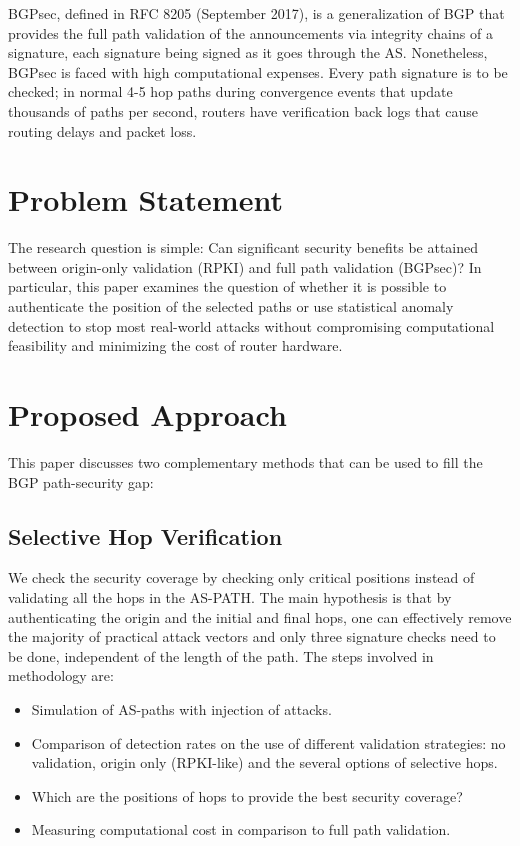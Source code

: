 \documentclass[conference]{IEEEtran}
\begin{document}
BGPsec, defined in RFC 8205 (September 2017), is a generalization of BGP that provides the full path validation of the announcements via integrity chains of a signature, each signature being signed as it goes through the AS. Nonetheless, BGPsec is faced with high computational expenses. Every path signature is to be checked; in normal 4-5 hop paths during convergence events that update thousands of paths per second, routers have verification back logs that cause routing delays and packet loss.

\section{Problem Statement}

The research question is simple: Can significant security benefits be attained between origin-only validation (RPKI) and full path validation (BGPsec)? In particular, this paper examines the question of whether it is possible to authenticate the position of the selected paths or use statistical anomaly detection to stop most real-world attacks without compromising computational feasibility and minimizing the cost of router hardware.

\section{Proposed Approach}

This paper discusses two complementary methods that can be used to fill the BGP path-security gap:

\subsection{Selective Hop Verification}

We check the security coverage by checking only critical positions instead of validating all the hops in the AS-PATH. The main hypothesis is that by authenticating the origin and the initial and final hops, one can effectively remove the majority of practical attack vectors and only three signature checks need to be done, independent of the length of the path. The steps involved in methodology are:

\begin{itemize}
\item Simulation of AS-paths with injection of attacks.
\item Comparison of detection rates on the use of different validation strategies: no validation, origin only (RPKI-like) and the several options of selective hops.
\item Which are the positions of hops to provide the best security coverage?
\item Measuring computational cost in comparison to full path validation.
\end{itemize}
\end{document}
